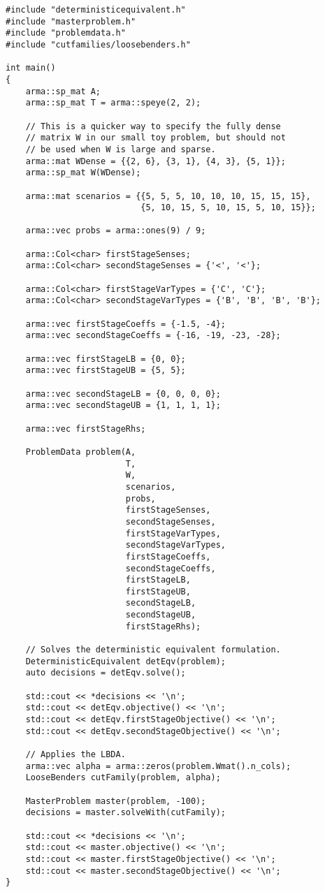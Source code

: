 \documentclass[12pt, english]{article}
\begin{document}
\begin{lstlisting}[caption={Specifying a custom problem in C++.},
                   label={listing:custom_example_c++}]
#include "deterministicequivalent.h"
#include "masterproblem.h"
#include "problemdata.h"
#include "cutfamilies/loosebenders.h"

int main()
{
    arma::sp_mat A;
	arma::sp_mat T = arma::speye(2, 2);
	
	// This is a quicker way to specify the fully dense 
	// matrix W in our small toy problem, but should not
	// be used when W is large and sparse. 
	arma::mat WDense = {{2, 6}, {3, 1}, {4, 3}, {5, 1}};
	arma::sp_mat W(WDense);
	
	arma::mat scenarios = {{5, 5, 5, 10, 10, 10, 15, 15, 15},
	                       {5, 10, 15, 5, 10, 15, 5, 10, 15}};
	
	arma::vec probs = arma::ones(9) / 9;
	
	arma::Col<char> firstStageSenses;
	arma::Col<char> secondStageSenses = {'<', '<'};
	
	arma::Col<char> firstStageVarTypes = {'C', 'C'};
	arma::Col<char> secondStageVarTypes = {'B', 'B', 'B', 'B'};
	
	arma::vec firstStageCoeffs = {-1.5, -4};
	arma::vec secondStageCoeffs = {-16, -19, -23, -28};
	
	arma::vec firstStageLB = {0, 0};
	arma::vec firstStageUB = {5, 5};
	
	arma::vec secondStageLB = {0, 0, 0, 0};
	arma::vec secondStageUB = {1, 1, 1, 1};
	
	arma::vec firstStageRhs;
	
	ProblemData problem(A,
						T,
						W,
						scenarios,
						probs,
						firstStageSenses,
						secondStageSenses,
						firstStageVarTypes,
						secondStageVarTypes,
						firstStageCoeffs,
						secondStageCoeffs,
						firstStageLB,
						firstStageUB,
						secondStageLB,
						secondStageUB,
						firstStageRhs);

	// Solves the deterministic equivalent formulation.
	DeterministicEquivalent detEqv(problem);
	auto decisions = detEqv.solve();
	
	std::cout << *decisions << '\n';
	std::cout << detEqv.objective() << '\n';
	std::cout << detEqv.firstStageObjective() << '\n';
	std::cout << detEqv.secondStageObjective() << '\n';
	
	// Applies the LBDA.
	arma::vec alpha = arma::zeros(problem.Wmat().n_cols);
	LooseBenders cutFamily(problem, alpha);
	
	MasterProblem master(problem, -100);
	decisions = master.solveWith(cutFamily);
	
	std::cout << *decisions << '\n';
	std::cout << master.objective() << '\n';
	std::cout << master.firstStageObjective() << '\n';
	std::cout << master.secondStageObjective() << '\n';
}
\end{lstlisting}
\end{document}
